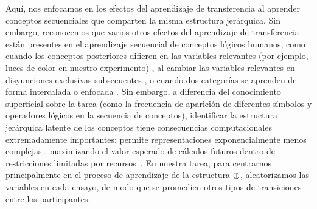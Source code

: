 Aquí, nos enfocamos en los efectos del aprendizaje de transferencia al aprender conceptos secuenciales que comparten la misma estructura jerárquica. Sin embargo, reconocemos que varios otros efectos del aprendizaje de transferencia están presentes en el aprendizaje secuencial de conceptos lógicos humanos, como cuando los conceptos posteriores difieren en las variables relevantes (por ejemplo, luces de color en nuestro experimento) \cite{blair2009extremely}, al cambiar las variables relevantes en disyunciones exclusivas subsecuentes \cite{kruschke1996dimensional}, o cuando dos categorías se aprenden de forma intercalada o enfocada \cite{carvalho2014putting}. Sin embargo, a diferencia del conocimiento superficial sobre la tarea (como la frecuencia de aparición de diferentes símbolos y operadores lógicos en la secuencia de conceptos), identificar la estructura jerárquica latente de los conceptos tiene consecuencias computacionales extremadamente importantes: permite representaciones exponencialmente menos complejas \cite{bengio2013representation,lake2015human}, maximizando el valor esperado de cálculos futuros dentro de restricciones limitadas por recursos~\cite{gershman2015computational}. En nuestra tarea, para centrarnos principalmente en el proceso de aprendizaje de la estructura $ \oplus $, aleatorizamos las variables en cada ensayo, de modo que se promedien otros tipos de transiciones entre los participantes.

